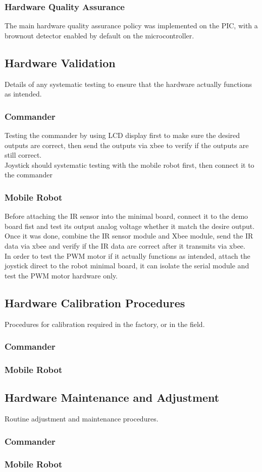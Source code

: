 \documentclass[11pt,a4paper]{article}
\begin{document}
    \subsubsection{Hardware Quality Assurance}
      The main hardware quality assurance policy was implemented on the PIC, with a brownout detector enabled by default on the microcontroller.\\

  \subsection{Hardware Validation}
    Details of any systematic testing to ensure that the hardware actually functions as intended.
    \subsubsection{Commander}
    Testing the commander by using LCD display first to make sure the desired outputs are correct, then send the outputs via
    xbee to verify if the outputs are still correct. \\
    Joystick should systematic testing with the mobile robot first, then connect it to the commander\\
    \subsubsection{Mobile Robot}
    Before attaching the IR sensor into the minimal board, connect it to the demo board fist and test its output analog          voltage whether it match the desire output. Once it was done, combine the IR sensor module and Xbee module, send the IR      data via xbee and verify if the IR data are correct after it transmits via xbee.\\
    In order to test the PWM motor if it actually functions as intended, attach the joystick direct to the robot minimal board, it can isolate the serial module and test the PWM motor hardware only. \\

  \subsection{Hardware Calibration Procedures}
    Procedures for calibration required in the factory, or in the field.
    \subsubsection{Commander}
    \subsubsection{Mobile Robot}

  \subsection{Hardware Maintenance and Adjustment}
    Routine adjustment and maintenance procedures.
    \subsubsection{Commander}
    \subsubsection{Mobile Robot}
\end{document}

